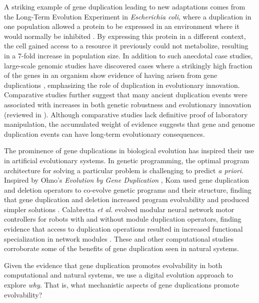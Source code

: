 A striking example of gene duplication leading to new adaptations
comes from the Long-Term Evolution Experiment in \textit{Escherichia coli}, where a duplication in one population allowed a protein to be expressed in an environment where it would normally be inhibited \citep{blount_genomic_2012}.
By expressing this protein in a different context, the cell gained access to a resource it previously could not metabolize, resulting in a 7-fold increase in population size.
In addition to such anecdotal case studies, large-scale genomic studies have discovered cases where a strikingly high fraction of the genes in an organism show evidence of having arisen from gene duplications \citep{teichmann_structural_1998,Teichmann:2004cz}, emphasizing the role of duplication in evolutionary innovation.
Comparative studies further suggest that many ancient duplication events were associated with increases in both genetic robustness and evolutionary innovation (reviewed in \citep{wagner_gene_2008}).
Although comparative studies lack definitive proof of laboratory manipulation, the accumulated weight of evidence suggests that gene and genome duplication events can have long-term evolutionary consequences.

The prominence of gene duplications in biological evolution has inspired their use in artificial evolutionary systems.
In genetic programming, the optimal program architecture for solving a particular problem is challenging to predict \textit{a priori}.
Inspired by Ohno's \textit{Evolution by Gene Duplication} \citep{ohno1970evolution}, Koza used gene duplication and deletion operators to co-evolve genetic programs and their structure, finding that gene duplication and deletion increased program evolvability and produced simpler solutions \citep{Koza:1995fr}.
Calabretta \textit{et al.} evolved modular neural network motor controllers for robots with and without module duplication operators, finding evidence that access to duplication operations resulted in increased functional specialization in network modules \citep{Calabretta:1998vh,Calabretta:2000tl}.
These and other computational studies \citep{Ryan:1998gm,Sawai:1999genetic,Sawai:2000comparative,Schmitt:2005bc} corroborate some of the benefits of gene duplication seen in natural systems.

Given the evidence that gene duplication promotes evolvability in both computational and natural systems, we use a digital evolution approach to explore \textit{why}.
That is, what mechanistic aspects of gene duplications promote evolvability?

